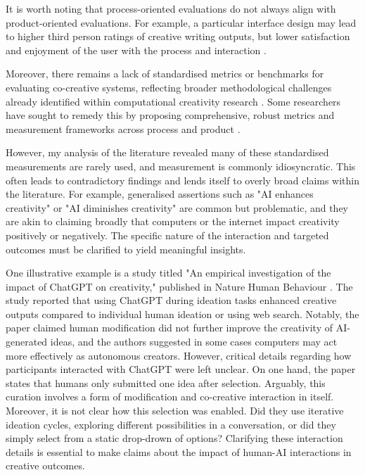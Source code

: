 It is worth noting that process-oriented evaluations do not always align with product-oriented evaluations. For example, a particular interface design may lead to higher third person ratings of creative writing outputs, but lower satisfaction and enjoyment of the user with the process and interaction \cite{Lee2022-rj}. 

Moreover, there remains a lack of standardised metrics or benchmarks for evaluating co-creative systems, reflecting broader methodological challenges already identified within computational creativity research \cite{Jordanous2012-kw}. Some researchers have sought to remedy this by proposing comprehensive, robust metrics and measurement frameworks across process and product \cite{Kantosalo2019-pz, Davis2016-te, Lawton2023-gd, Lee2022-rj}. 

However, my analysis of the literature revealed many of these standardised measurements are rarely used, and measurement is commonly idiosyncratic. This often leads to contradictory findings and lends itself to overly broad claims within the literature. For example, generalised assertions such as "AI enhances creativity" or "AI diminishes creativity" are common but problematic, and they are akin to claiming broadly that computers or the internet impact creativity positively or negatively. The specific nature of the interaction and targeted outcomes must be clarified to yield meaningful insights.

One illustrative example is a study titled "An empirical investigation of the impact of ChatGPT on creativity," published in Nature Human Behaviour \cite{Lee2024-vz}. The study reported that using ChatGPT during ideation tasks enhanced creative outputs compared to individual human ideation or using web search. Notably, the paper claimed human modification did not further improve the creativity of AI-generated ideas, and the authors suggested in some cases computers may act more effectively as autonomous creators. However, critical details regarding how participants interacted with ChatGPT were left unclear. On one hand, the paper states that humans only submitted one idea after selection. Arguably, this curation involves a form of modification and co-creative interaction in itself. Moreover, it is not clear how this selection was enabled. Did they use iterative ideation cycles, exploring different possibilities in a conversation, or did they simply select from a static drop-drown of options? Clarifying these interaction details is essential to make claims about the impact of human-AI interactions in creative outcomes.

